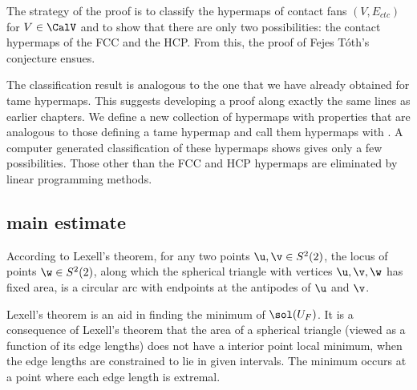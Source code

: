The strategy of the proof is to classify the hypermaps of contact
fans $(V,E_{ctc})$ for $V\in \CalV$ and to show that there are only two
possibilities: the contact hypermaps of the FCC and the HCP.  From
this, the proof of Fejes T\'oth's conjecture ensues.

The classification result is analogous to the one that we have already
obtained for tame hypermaps.  This suggests developing a proof along
exactly the same lines as earlier chapters.  We define a new
collection of hypermaps with properties that are analogous to those
defining a tame hypermap and call them hypermaps with 
.  A computer generated classification of these hypermaps
shows gives only a few possibilities.  Those other than the FCC and
HCP hypermaps are eliminated by linear programming methods.

\subsection{main estimate}




\begin{remark}
According to Lexell's theorem, for any two points $\u,\v\in S^2(2)$,
the locus of points $\w\in S^2(2)$, along which
the spherical triangle with vertices $\u,\v,\w$ has fixed area, is a circular arc
with endpoints at the antipodes of $\u$ and $\v$.



Lexell's theorem is an aid in finding the minimum of
  $\sol(U_F)$.
  It is a consequence of Lexell's theorem that the area of a spherical
  triangle (viewed as a function of its edge lengths) does not have a
  interior point local minimum, when the edge lengths are
  constrained to lie in given intervals.  The minimum occurs at a
  point where each edge length is extremal.
%
%
\end{remark}

